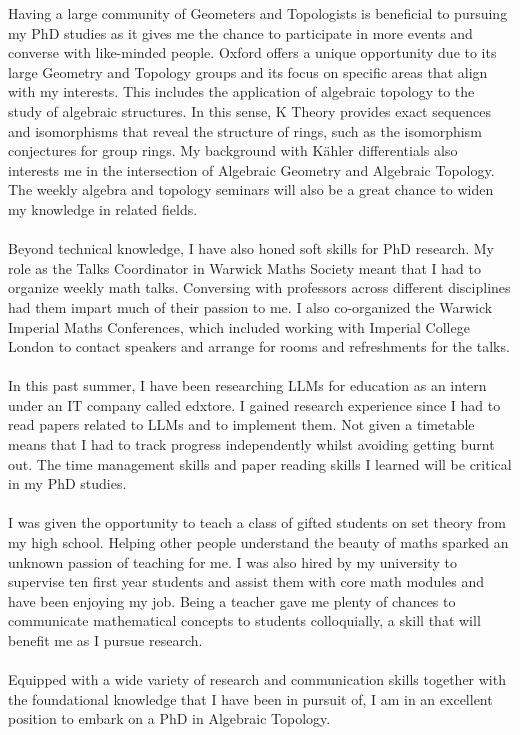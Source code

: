 \documentclass[a4paper]{article}
\begin{document}
Having a large community of Geometers and Topologists is beneficial to pursuing my PhD studies as it gives me the chance to participate in more events and converse with like-minded people. Oxford offers a unique opportunity due to its large Geometry and Topology groups and its focus on specific areas that align with my interests. This includes the application of algebraic topology to the study of algebraic structures. In this sense, K Theory provides exact sequences and isomorphisms that reveal the structure of rings, such as the isomorphism conjectures for group rings. My background with Kähler differentials also interests me in the intersection of Algebraic Geometry and Algebraic Topology. The weekly algebra and topology seminars will also be a great chance to widen my knowledge in related fields. \\~\\

Beyond technical knowledge, I have also honed soft skills for PhD research. My role as the Talks Coordinator in Warwick Maths Society meant that I had to organize weekly math talks. Conversing with professors across different disciplines had them impart much of their passion to me. I also co-organized the Warwick Imperial Maths Conferences, which included working with Imperial College London to contact speakers and arrange for rooms and refreshments for the talks. \\~\\

In this past summer, I have been researching LLMs for education as an intern under an IT company called edxtore. I gained research experience since I had to read papers related to LLMs and to implement them. Not given a timetable means that I had to track progress independently whilst avoiding getting burnt out. The time management skills and paper reading skills I learned will be critical in my PhD studies. \\~\\

I was given the opportunity to teach a class of gifted students on set theory from my high school. Helping other people understand the beauty of maths sparked an unknown passion of teaching for me. I was also hired by my university to supervise ten first year students and assist them with core math modules and have been enjoying my job. Being a teacher gave me plenty of chances to communicate mathematical concepts to students colloquially, a skill that will benefit me as I pursue research. \\~\\

Equipped with a wide variety of research and communication skills together with the foundational knowledge that I have been in pursuit of, I am in an excellent position to embark on a PhD in Algebraic Topology.
\end{document}

